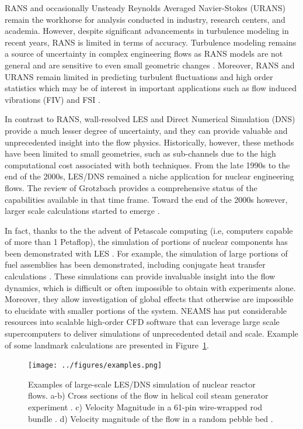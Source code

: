 \documentclass[11pt,letterpaper,english]{article}
\begin{document}
RANS \cite{conner2010cfd} and occasionally Unsteady Reynolds Averaged Navier-Stokes (URANS) remain the workhorse for analysis conducted in industry, research centers, and academia.  However, despite significant advancements in turbulence modeling in recent years, RANS is limited in terms of accuracy. Turbulence modeling remains a source of uncertainty in complex engineering flows as RANS models are not general and are sensitive to even small geometric changes \cite{merzari2010numerical}. Moreover, RANS and URANS remain limited in predicting turbulent fluctuations and high order statistics which may be of interest in important applications such as flow induced vibrations (FIV) and FSI \cite{yuan2017flow}.

In contrast to RANS, wall-resolved LES and Direct Numerical Simulation (DNS) provide a much lesser degree of uncertainty, and they can provide valuable and unprecedented insight into the flow physics. Historically, however, these methods have been limited to small geometries, such as sub-channels \cite{grotzbach1999direct} due to the high computational cost associated with both techniques. From the late 1990s to the end of the 2000s, LES/DNS remained a niche application for nuclear engineering flows. The review of Grotzbach \cite{grotzbach1999direct} provides a comprehensive status of the capabilities available in that time frame. Toward the end of the 2000s however, larger scale calculations started to emerge \cite{pointer2009simulations}.

In fact, thanks to the the advent of Petascale computing (i.e, computers capable of more than 1 Petaflop), the simulation of portions of nuclear components has been demonstrated with LES \cite{merzari2017large}. For example, the simulation of large portions of fuel assemblies has been demonstrated, including conjugate heat transfer calculations \cite{obabko2019}. These simulations can provide invaluable insight into the flow dynamics, which is difficult or often impossible to obtain with experiments alone. Moreover, they allow investigation of global effects that otherwise are impossible to elucidate with smaller portions of the system. NEAMS has put considerable resources into scalable high-order CFD software that can leverage large scale supercomputers to deliver simulations of unprecedented detail and scale. Example of some landmark calculations are presented in Figure~\ref{f:examples}.

\begin{figure}[!ht]
\centering
\texttt{[image: ../figures/examples.png]}
\caption{Examples of large-scale LES/DNS simulation of nuclear reactor flows. a-b) Cross sections of the flow in helical coil steam generator experiment \cite{alper2018}. c) Velocity Magnitude in a 61-pin wire-wrapped rod bundle \cite{goth2018comparison}. d) Velocity magnitude of the flow in a random pebble bed \cite{yuan2019}.}
\label{f:examples}
\end{figure}
\end{document}
